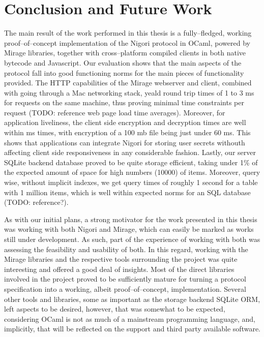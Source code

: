 \chapter{Conclusion and Future Work} \label{chapter:conclusion}
The main result of the work performed in this thesis is a fully--fledged, working proof--of--concept implementation of the Nigori protocol in OCaml, powered by Mirage libraries, together with cross--platform compiled clients in both native bytecode and Javascript.
Our evaluation shows that the main aspects of the protocol fall into good functioning norms for the main pieces of functionality provided.
The HTTP capabilities of the Mirage webserver and client, combined with going through a Mac networking stack, yeald round trip times of 1 to 3 ms for requests on the same machine, thus proving minimal time constraints per request (TODO: reference web page load time averages).
Moreover, for application liveliness, the client side encryption and decryption times are well within ms times, with  encryption of a 100 mb file being just under 60 ms.
This shows that applications can integrate Nigori for storing user secrets withouth affecting client side responsiveness in any considerable fashion.
Lastly, our server SQLite backend database proved to be quite storage efficient, taking under 1\% of the expected amount of space for high numbers (10000) of items.
Moreover, query wise, without implicit indexes, we get query times of roughly 1 second for a table with 1 million items, which is well within expected norms for an SQL database (TODO: reference?).

As with our initial plans, a strong motivator for the work presented in this thesis was working with both Nigori and Mirage, which can easily be marked as works still under development.
As such, part of the experience of working with both was assessing the feasibility and usability of both.
In this regard, working with the Mirage libraries and the respective tools surrounding the project was quite interesting and offered a good deal of insights.
Most of the direct libraries involved in the project proved to be sufficiently mature for turning a protocol specification into a working, albeit proof--of--concept, implementation.
Several other tools and libraries, some as important as the storage backend SQLite ORM, left aspects to be desired, however, that was somewhat to be expected, considering OCaml is not as much of a mainstream programming language, and, implicitly, that will be reflected on the support and third party available software.

